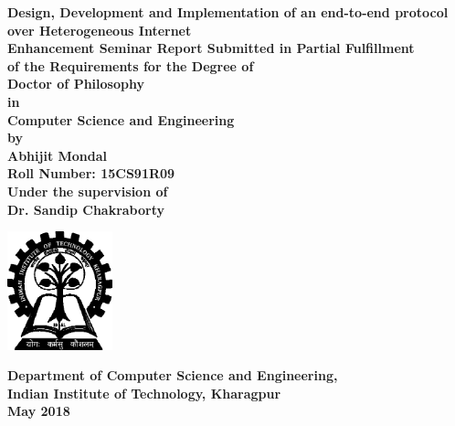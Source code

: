 \thispagestyle{empty}
\begin{titlepage}
\begin{center}
    \vspace*{0.5in}
    {\huge\textbf{Design, Development and Implementation of an end-to-end protocol over Heterogeneous Internet }} \\
    \vspace{0.6in}
     {\large\bf Enhancement Seminar Report Submitted in Partial Fulfillment\\ of the Requirements for the Degree of }\\
     \vspace{0.3in}
     {\large\bf Doctor of Philosophy}\\
     {\large\bf in}\\
     {\large\bf Computer Science and Engineering}\\     
    \vspace{0.5in}
    {\large\bf by}\\
    \vspace{0.3in}
    {\Large\bf Abhijit Mondal}\\
    \vspace{0.1in}
    {\Large\bf Roll Number: 15CS91R09}\\
    \vspace{0.5in}
    {\large\bf Under the supervision of}\\
    \vspace{0.2in}
    {\Large\bf  Dr. Sandip Chakraborty}\\
    \vspace{0.5in}
    \begin{center}
        \includegraphics[width=1.2in]{img/iit_logo}
    \end{center}
    {\Large\textbf{Department of Computer Science and Engineering,}}\medskip\\
    {\Large\textbf{Indian Institute of Technology, Kharagpur}}\medskip\\
    {\large\textbf{May 2018}}
\end{center}
\end{titlepage}